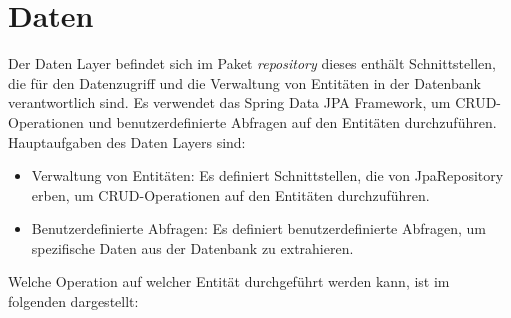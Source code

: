 
\chapter{Daten}
\label{ch:data}


Der Daten Layer befindet sich im Paket \textit{repository} dieses enthält Schnittstellen, die für den Datenzugriff und die Verwaltung von Entitäten in der Datenbank verantwortlich sind. 
Es verwendet das Spring Data JPA Framework, um \gls{CRUD}-Operationen und benutzerdefinierte Abfragen auf den Entitäten durchzuführen.  
Hauptaufgaben des Daten Layers sind:

\begin{itemize}
    \item Verwaltung von Entitäten: Es definiert Schnittstellen, die von JpaRepository erben, um CRUD-Operationen auf den Entitäten durchzuführen.
    \item Benutzerdefinierte Abfragen: Es definiert benutzerdefinierte Abfragen, um spezifische Daten aus der Datenbank zu extrahieren.
\end{itemize}

Welche Operation auf welcher Entität durchgeführt werden kann, ist im folgenden dargestellt: 

